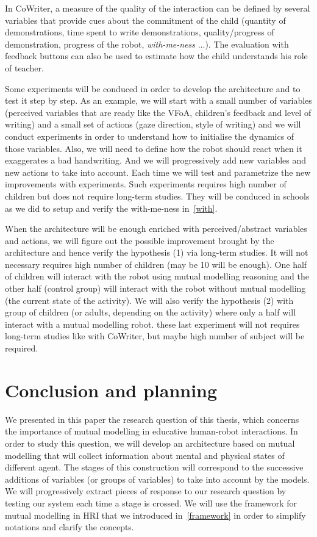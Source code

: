 \documentclass[10pt,a4paper]{article}
\begin{document}
In CoWriter, a measure of the quality of the interaction can be defined by several variables that provide cues about the commitment of the child (quantity of demonstrations, time spent to write demonstrations, quality/progress of demonstration, progress of the robot, \textit{with-me-ness} ...). The evaluation with feedback buttons can also be used to estimate how the child understands his role of teacher.

Some experiments will be conduced in order to develop the architecture and to test it step by step. 
As an example, we will start with a small number of variables (perceived variables that are ready like the VFoA, children's feedback and level of writing) and a small set of actions (gaze direction, style of writing) and we will conduct experiments in order to understand how to initialise the dynamics of those variables. 
Also, we will need to define how the robot should react when it exaggerates a bad handwriting. And we will progressively add new variables  and new actions to take into account. 
Each time we will test and parametrize the new improvements with experiments. Such experiments requires high number of children but does not require long-term studies. They will be conduced in schools as we did to setup and verify the with-me-ness in~\ref{with}.

When the architecture will be enough enriched with perceived/abstract variables and actions, we will figure out the possible improvement brought by the architecture and hence verify the hypothesis (1) via long-term studies. It will not necessary requires high number of children (may be 10 will be enough). One half of children will interact with the robot using mutual modelling reasoning and the other half (control group) will interact with the robot without mutual modelling (the current state of the activity). We will also verify the hypothesis (2) with group of children (or adults, depending on the activity) where only a half will interact with a mutual modelling robot. these last experiment will not requires long-term studies like with CoWriter, but maybe high number of subject will be required.

\section{Conclusion and planning}

We presented in this paper the research question of this thesis, which concerns the importance of mutual modelling in educative human-robot interactions. In order to study this question, we will develop an architecture based on mutual modelling that will collect information about mental and physical states of different agent. The stages of this construction will correspond to the successive additions of variables (or groups of variables) to take into account by the models. We will progressively extract pieces of response to our research question by testing our system each time a stage is crossed. We will use the framework for mutual modelling in HRI that we introduced in~\ref{framework} in order to simplify notations and clarify the concepts. 


\small
 
\end{document}
